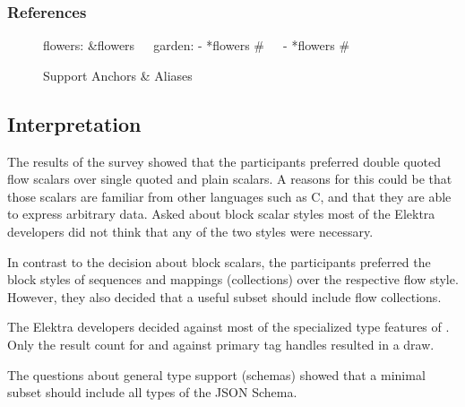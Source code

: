 \subsubsection{References}

\begin{figure}[H]
  \begin{minipage}[t]{0.48\textwidth}
    \vspace{0pt}
    \begin{bchart}[max=9, width=0.85\textwidth]
    \end{bchart}
  \end{minipage}
  \begin{minipage}[t]{0.48\textwidth}
    \vspace{0pt}
    \begin{yamlcode}
      flowers: &flowers
        🌳🌸🌼
      garden:
        - *flowers # 🌳🌸🌼
        - *flowers # 🌳🌸🌼
    \end{yamlcode}
  \end{minipage}
  \caption{Support Anchors \& Aliases}
\end{figure}

\subsection{Interpretation}

The results of the survey showed that the participants preferred double quoted flow scalars over single quoted and plain scalars. A reasons for this could be that those scalars are familiar from other languages such as C, and that they are able to express arbitrary data. Asked about block scalar styles most of the Elektra developers did not think that any of the two styles were necessary.

In contrast to the decision about block scalars, the participants preferred the block styles of sequences and mappings (\glspl{collection}) over the respective flow style. However, they also decided that a useful  subset should include flow \glspl{collection}.

The Elektra developers decided against most of the specialized type features of . Only the result count for and against primary tag handles resulted in a draw.

The questions about general type support (schemas) showed that a minimal  subset should include all types of the \gls{JSON} Schema.

